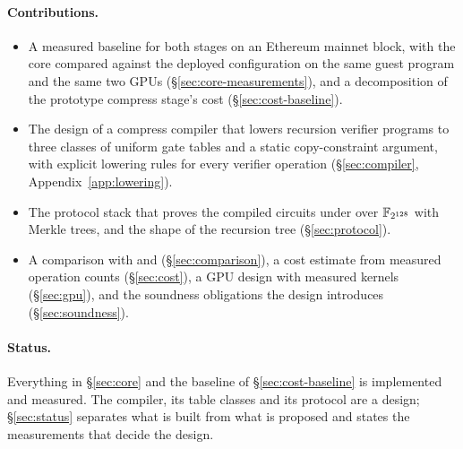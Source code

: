 \paragraph{Contributions.}
\begin{itemize}
  \item A measured baseline for both stages on an Ethereum mainnet block, with the core compared against the deployed \Poseidon{} configuration on the same guest program and the same two GPUs (\S\ref{sec:core-measurements}), and a decomposition of the prototype compress stage's cost (\S\ref{sec:cost-baseline}).
  \item The design of a compress compiler that lowers recursion verifier programs to three classes of uniform gate tables and a static copy-constraint argument, with explicit lowering rules for every verifier operation (\S\ref{sec:compiler}, Appendix~\ref{app:lowering}).
  \item The protocol stack that proves the compiled circuits under \WHIR{} over $\mathbb{F}_{2^{128}}$ with \Blake{} Merkle trees, and the shape of the recursion tree (\S\ref{sec:protocol}).
  \item A comparison with \Flock{} and \Binius{} (\S\ref{sec:comparison}), a cost estimate from measured operation counts (\S\ref{sec:cost}), a GPU design with measured kernels (\S\ref{sec:gpu}), and the soundness obligations the design introduces (\S\ref{sec:soundness}).
\end{itemize}

\paragraph{Status.} Everything in \S\ref{sec:core} and the baseline of \S\ref{sec:cost-baseline} is implemented and measured. The compiler, its table classes and its protocol are a design; \S\ref{sec:status} separates what is built from what is proposed and states the measurements that decide the design.
